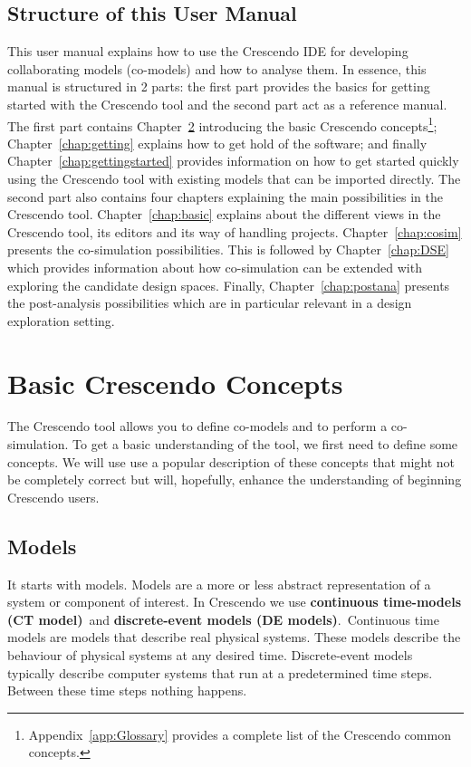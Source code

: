 \documentclass{crescendorepchap}
\begin{document}
\section{Structure of this User Manual}\label{sec:structure}

This user manual explains how to use the Crescendo IDE for developing collaborating models
 (co-models) and how to analyse them. In essence, this manual is structured in 2 parts: the first part provides the basics for getting started with the Crescendo tool and the second part act as a reference manual. The first part contains Chapter~\ref{chap:introconcepts} introducing the basic Crescendo concepts\footnote{Appendix~\ref{app:Glossary} provides a complete list of the Crescendo common concepts.}; Chapter~\ref{chap:getting} explains how to get hold of the software; and finally
Chapter~\ref{chap:gettingstarted} provides information on how to get started quickly using the Crescendo tool with existing models that can be imported directly. The second part also contains four chapters explaining the main possibilities in the Crescendo tool. Chapter~\ref{chap:basic} explains about the different views in the Crescendo tool, its editors and its way of handling projects. Chapter~\ref{chap:cosim} presents the co-simulation possibilities. This is followed by Chapter~\ref{chap:DSE} which provides information about how co-simulation can be extended with exploring the candidate design spaces. Finally, Chapter~\ref{chap:postana} presents the post-analysis possibilities which are in particular relevant in a design exploration setting.

\chapter{Basic Crescendo Concepts}\label{chap:introconcepts}

The Crescendo tool allows you to define co-models and to perform a co-simulation. To get a
basic understanding of the tool, we first need to define some concepts.
We will use use a popular description of these concepts that might not
be completely correct but will, hopefully, enhance the understanding of
beginning Crescendo users.

\section{Models}

It starts with models. Models are a more or less abstract representation
of a system or component of interest. In Crescendo we use
\textbf{continuous time-models (CT model)}~and \textbf{discrete-event
models (DE models)}.~Continuous time models are models that describe
real physical systems. These models describe the behaviour of physical
systems at any desired time. Discrete-event models typically describe
computer systems that run at a predetermined time steps. Between these
time steps nothing happens.
\end{document}

